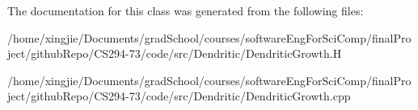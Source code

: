 The documentation for this class was generated from the following files\+:\begin{DoxyCompactItemize}
\item 
/home/xingjie/\+Documents/grad\+School/courses/software\+Eng\+For\+Sci\+Comp/final\+Project/github\+Repo/\+C\+S294-\/73/code/src/\+Dendritic/Dendritic\+Growth.\+H\item 
/home/xingjie/\+Documents/grad\+School/courses/software\+Eng\+For\+Sci\+Comp/final\+Project/github\+Repo/\+C\+S294-\/73/code/src/\+Dendritic/Dendritic\+Growth.\+cpp\end{DoxyCompactItemize}
